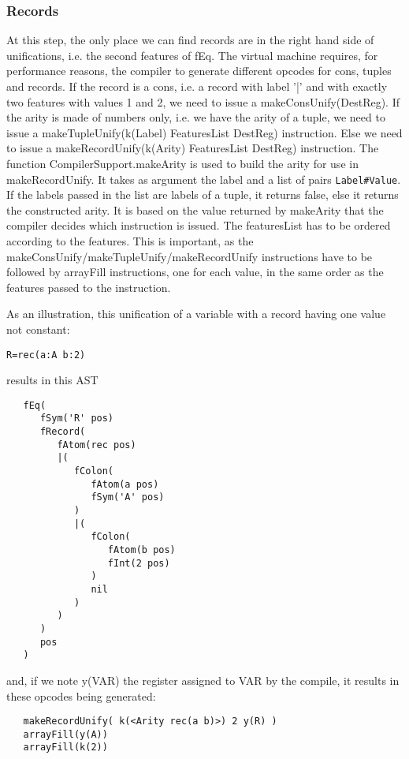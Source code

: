 \documentclass[a4paper]{memoir}
\begin{document}
\subsubsection{Records}
At this step, the only place we can find records are in the right hand side of unifications, i.e. the second features of fEq. 
The virtual machine requires, for performance reasons, the compiler to generate different opcodes for cons, tuples and records.
If the record is a cons, i.e. a record with label '|' and with exactly two features with values 1 and 2, we need to issue a makeConsUnify(DestReg). If the arity is made of numbers only, i.e. we have the arity of a tuple, we need to issue a makeTupleUnify(k(Label) FeaturesList DestReg) instruction. Else we need to issue a makeRecordUnify(k(Arity) FeaturesList DestReg) instruction.
The function CompilerSupport.makeArity is used to build the arity for use in makeRecordUnify. It takes as argument the label and a list of pairs \lstinline!Label#Value!. If the labels passed in the list are labels of a tuple, it returns false, else it returns the constructed arity. It is based on the value returned by makeArity that the compiler decides which instruction is issued.
The featuresList has to be ordered according to the features. This is important, as the makeConsUnify/makeTupleUnify/makeRecordUnify instructions have to be followed by arrayFill instructions, one for each value, in the same order as the features passed to the instruction.

As an illustration, this unification of a variable with a record having one value not constant:
\begin{lstlisting}
R=rec(a:A b:2)
\end{lstlisting}
results in this AST
\begin{lstlisting}
   fEq(
      fSym('R' pos)
      fRecord(
         fAtom(rec pos)
         |(
            fColon(
               fAtom(a pos)
               fSym('A' pos)
            )
            |(
               fColon(
                  fAtom(b pos)
                  fInt(2 pos)
               )
               nil
            )
         )
      )
      pos
   )
\end{lstlisting}
and, if we note y(VAR) the register assigned to VAR by the compile, it results in these opcodes being generated:

\begin{lstlisting}
   makeRecordUnify( k(<Arity rec(a b)>) 2 y(R) )
   arrayFill(y(A))
   arrayFill(k(2)) 
\end{lstlisting}
\end{document}
